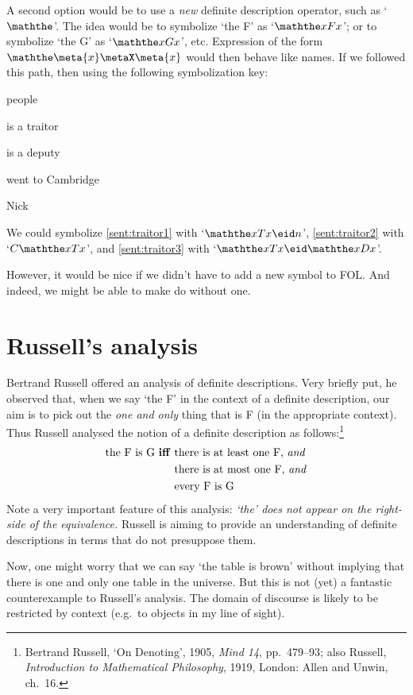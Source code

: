 A second option would be to use a \emph{new} definite description operator, such as `$\maththe$'. The idea would be to symbolize `the F' as `$\maththe xFx$'; or to symbolize `the G' as `$\maththe xGx$', etc. Expression of the form $\maththe \meta{x} \metaX\meta{x}$ would then behave like names. If we followed this path, then using the following symbolization key:
	\begin{ekey}
		\item[\text{domain}] people
		\item[Tx]  is a traitor
		\item[Dx]  is a deputy
		\item[Cx]  went to Cambridge
		\item[n] Nick
	\end{ekey}
We could symbolize \cref{sent:traitor1} with `$\maththe x Tx \eid  n$', \cref{sent:traitor2} with `$C\maththe xTx$', and \cref{sent:traitor3} with `$\maththe x Tx \eid  \maththe x Dx$'.

However, it would be nice if we didn't have to add a new symbol to FOL. And indeed, we might be able to make do without one.

\section{Russell's analysis}
Bertrand Russell offered an analysis of definite descriptions. Very briefly put, he observed that, when we say `the F' in the context of a definite description, our aim is to pick out the \emph{one and only} thing that is F (in the appropriate context). Thus Russell analysed the notion of a definite description as follows:\footnote{Bertrand Russell, `On Denoting', 1905, \emph{Mind 14}, pp.\ 479--93; also Russell, \emph{Introduction to Mathematical Philosophy}, 1919, London: Allen and Unwin, ch.\ 16.}
	\begin{align*}
		\text{the F is G \textbf{iff} }&\text{there is at least one F, \emph{and}}\\
	&\text{there is at most one F, \emph{and}}\\
	&\text{every F is G}
\end{align*}
Note a very important feature of this analysis: \emph{`the' does not appear on the right-side of the equivalence.} Russell is aiming to provide an understanding of definite descriptions in terms that do not presuppose them.

Now, one might worry that we can say `the table is brown' without implying that there is one and only one table in the universe. But this is not (yet) a fantastic counterexample to Russell's analysis. The domain of discourse is likely to be restricted by context (e.g.\ to objects in my line of sight).

